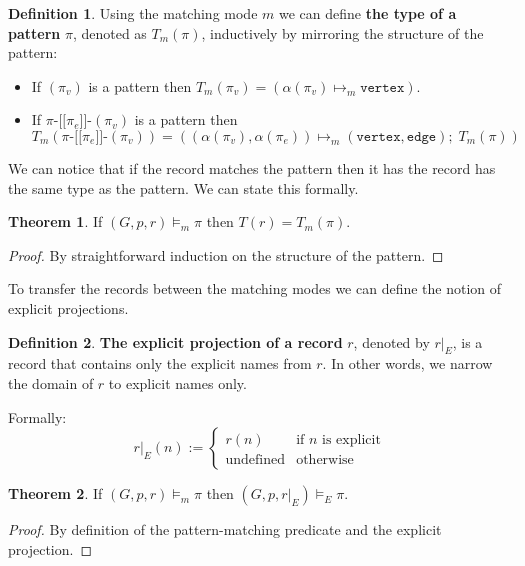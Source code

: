 \documentclass[14pt]{constructor-thesis}
\theoremstyle{definition}
\newtheorem{theorem}{Theorem}
\newtheorem{definition}{Definition}
\newcommand{\patternstart}[1]{(#1)}
\newcommand{\patternhop}[3]{#1 \texttt{-[[} #2 \texttt{]]-} (#3)}
\begin{document}
\begin{definition}
  Using the matching mode $m$ we can define \textbf{the type of a pattern} $\pi$, denoted as $T_m(\pi)$, inductively by mirroring the structure of the pattern:
  \begin{itemize}
    \item If $\patternstart{\pi_v}$ is a pattern then $T_m \patternstart{\pi_v} = (\alpha (\pi_v) \mapsto_m \texttt{vertex})$.
    \item If $\patternhop{\pi}{\pi_e}{\pi_v}$ is a pattern then
    $$ T_m(\patternhop{\pi}{\pi_e}{\pi_v}) = ((\alpha (\pi_v), \alpha (\pi_e)) \mapsto_m (\texttt{vertex}, \texttt{edge}); \; T_m(\pi)) $$
  \end{itemize}
\end{definition}

We can notice that if the record matches the pattern then it has the record has the same type as the pattern. We can state this formally.
\begin{theorem}
  \label{thm:matching-mode-type}
  If $(G, p, r) \models_m \pi$ then $T(r) = T_m(\pi)$.
\end{theorem}
\begin{proof}
  By straightforward induction on the structure of the pattern.
\end{proof}

To transfer the records between the matching modes we can define the notion of explicit projections.

\begin{definition}
  \textbf{The explicit projection of a record} $r$, denoted by $r |_E$, is a record that contains only the explicit names from $r$. In other words, we narrow the domain of $r$ to explicit names only.

  Formally:
  $$ r|_E(n) :=
    \begin{cases}
      r(n) & \text{if $n$ is explicit} \\
      \text{undefined} & \text{otherwise}
    \end{cases} $$
\end{definition}

\begin{theorem}
  \label{thm:matching-mode-narrow}
  If $(G, p, r)\models_m \pi$ then $(G, p, r |_E) \models_E \pi$.
\end{theorem}
\begin{proof}
  By definition of the pattern-matching predicate and the explicit projection.
\end{proof}
\end{document}
